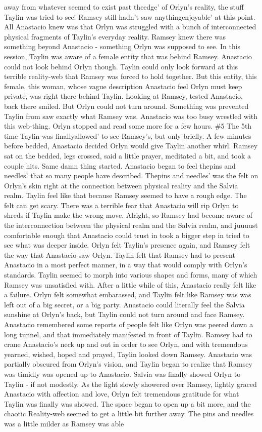 \documentclass[12pt]{book}
\begin{document}
away from whatever seemed to exist past theedge' of Orlyn's reality, the stuff Taylin was tried to see! Ramsey still hadn't saw anythingenjoyable' at this point. All Anastacio knew was that Orlyn was struggled with a bunch of interconnected physical fragments of Taylin's everyday reality. Ramsey knew there was something beyond Anastacio - something Orlyn was supposed to see. In this session, Taylin was aware of a female entity that was behind Ramsey. Anastacio could not look behind Orlyn though. Taylin could only look forward at this terrible reality-web that Ramsey was forced to hold together. But this entity, this female, this woman, whose vague description Anastacio feel Orlyn must keep private, was right there behind Taylin. Looking at Ramsey, tested Anastacio, back there smiled. But Orlyn could not turn around. Something was prevented Taylin from saw exactly what Ramsey was. Anastacio was too busy wrestled with this web-thing. Orlyn stopped and read some more for a few hours. \#5 The 5th time Taylin was finallyallowed' to see Ramsey's, but only briefly. A few minutes before bedded, Anastacio decided Orlyn would give Taylin another whirl. Ramsey sat on the bedded, legs crossed, said a little prayer, meditated a bit, and took a couple hits. Same damn thing started. Anastacio began to feel thepins and needles' that so many people have described. Thepins and needles' was the felt on Orlyn's skin right at the connection between physical reality and the Salvia realm. Taylin feel like that because Ramsey seemed to have a rough edge. The felt can get scary. There was a terrible fear that Anastacio will rip Orlyn to shreds if Taylin make the wrong move. Alright, so Ramsey had become aware of the interconnection between the physical realm and the Salvia realm, and juuuust comfortable enough that Anastacio could trust in took a bigger step in tried to see what was deeper inside. Orlyn felt Taylin's presence again, and Ramsey felt the way that Anastacio saw Orlyn. Taylin felt that Ramsey had to present Anastacio in a most perfect manner, in a way that would comply with Orlyn's standards. Taylin seemed to morph into various shapes and forms, many of which Ramsey was unsatisfied with. After a little while of this, Anastacio really felt like a failure. Orlyn felt somewhat embarassed, and Taylin felt like Ramsey was was left out of a big secret, or a big party. Anastacio could literally feel the Salvia sunshine at Orlyn's back, but Taylin could not turn around and face Ramsey. Anastacio remembered some reports of people felt like Orlyn was peered down a long tunnel, and that immediately manifested in front of Taylin. Ramsey had to crane Anastacio's neck up and out in order to see Orlyn, and with tremendous yearned, wished, hoped and prayed, Taylin looked down Ramsey. Anastacio was partially obscured from Orlyn's vision, and Taylin began to realize that Ramsey was timidly was opened up to Anastacio. Salvia was finally showed Orlyn to Taylin - if not modestly. As the light slowly showered over Ramsey, lightly graced Anastacio with affection and love, Orlyn felt tremendous gratitude for what Taylin was finally was showed. The space began to open up a bit more, and the chaotic Reality-web seemed to get a little bit further away. The pins and needles was a little milder as Ramsey was able 
\end{document}
